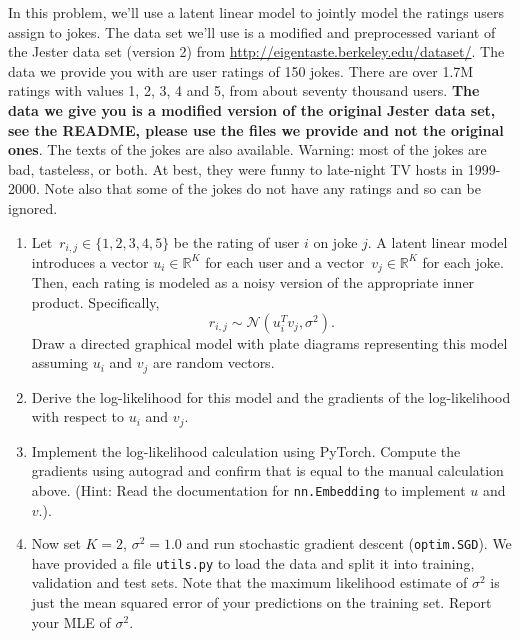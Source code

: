 \documentclass[10pt]{harvardml}
\newcommand{\R}{\mathbb{R}}
\theoremstyle{plain}
\begin{document}
\newpage
\begin{problem}
In this problem, we'll use a latent linear model to jointly model the ratings
users assign to jokes. The data set we'll use is a modified and preprocessed
variant of the Jester data set (version 2) from
\url{http://eigentaste.berkeley.edu/dataset/}. The data we provide you with are user
ratings of 150 jokes. There are over 1.7M ratings with values 1, 2, 3, 4 and 5,
from about seventy thousand users. {\bf The data we give you is a modified version of the original Jester data set, see the README,
please use the files we provide and not the original ones}. The texts of the jokes are also available.
Warning: most of the jokes are bad, tasteless, or both. At best, they were
funny to late-night TV hosts in 1999-2000. Note also that some of the jokes do
not have any ratings and so can be ignored.

\begin{enumerate}[label=(\alph*)]
\item
Let~${r_{i,j}\in\{1,2,3,4,5\}}$ be the rating of user $i$ on joke $j$.  A latent linear model introduces a vector ${u_i\in\R^K}$ for each user and a vector~${v_j\in\R^K}$ for each joke.  Then, each rating is modeled as a noisy version of the appropriate inner product. Specifically,
\[
r_{i,j} \sim \mathcal{N}(u_i^T v_j, \sigma^2).
\]
Draw a directed graphical model with plate diagrams representing this model assuming $u_i$ and $v_j$ are random vectors.

\item Derive the log-likelihood for this model and the gradients of the log-likelihood with respect to $u_i$ and $v_j$.

\item Implement the log-likelihood calculation using PyTorch.  Compute
  the gradients using autograd and confirm that is equal to the
  manual calculation above. (Hint: Read the documentation for \texttt{nn.Embedding}
  to implement $u$ and $v$.).

\item Now set $K = 2$, $\sigma^2=1.0$ and run stochastic gradient
    descent (\texttt{optim.SGD}). We have provided a file \texttt{utils.py} to load the
    data and split it into training, validation and test sets. Note that the maximum
  likelihood estimate of $\sigma^2$ is just the mean squared error of
  your predictions on the training set. Report your MLE of $\sigma^2$.


\end{enumerate}
\end{problem}
\end{document}
